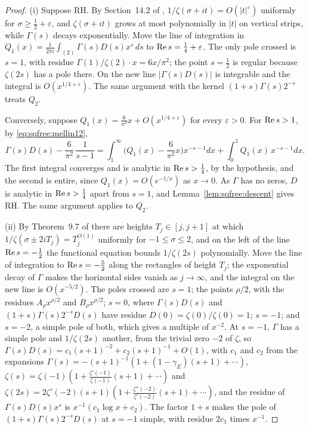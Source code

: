 \begin{proof}
(i) Suppose RH. By Section~14.2 of \cite{Titchmarsh}, $1/\zeta(\sigma+it)=O(|t|^\varepsilon)$ uniformly for $\sigma\ge\frac12+\varepsilon$, and $\zeta(\sigma+it)$ grows at most polynomially in $|t|$ on vertical strips, while $\Gamma(s)$ decays exponentially. Move the line of integration in $Q_1(x)=\frac1{2\pi i}\int_{(2)}\Gamma(s)D(s)x^s\,ds$ to $\operatorname{Re} s=\frac14+\varepsilon$. The only pole crossed is $s=1$, with residue $\Gamma(1)/\zeta(2)\cdot x=6x/\pi^2$; the point $s=\frac12$ is regular because $\zeta(2s)$ has a pole there. On the new line $|\Gamma(s)D(s)|$ is integrable and the integral is $O(x^{1/4+\varepsilon})$. The same argument with the kernel $(1+s)\Gamma(s)2^{-s}$ treats $Q_2$.

Conversely, suppose $Q_1(x)=\frac6{\pi^2}x+O(x^{1/4+\varepsilon})$ for every $\varepsilon>0$. For $\operatorname{Re} s>1$, by \eqref{eq:sqfree:mellin12},
\[
\Gamma(s)D(s)-\frac6{\pi^2}\,\frac1{s-1}=\int_1^\infty\Big(Q_1(x)-\frac6{\pi^2}x\Big)x^{-s-1}dx+\int_0^1Q_1(x)\,x^{-s-1}dx .
\]
The first integral converges and is analytic in $\operatorname{Re} s>\frac14$, by the hypothesis, and the second is entire, since $Q_1(x)=O(e^{-1/x})$ as $x\to0$. As $\Gamma$ has no zeros, $D$ is analytic in $\operatorname{Re} s>\frac14$ apart from $s=1$, and Lemma~\ref{lem:sqfree:descent} gives RH. The same argument applies to $Q_2$.

(ii) By Theorem~9.7 of \cite{Titchmarsh} there are heights $T_j\in[j,j+1]$ at which $1/\zeta(\sigma\pm2iT_j)=T_j^{O(1)}$ uniformly for $-1\le\sigma\le2$, and on the left of the line $\operatorname{Re} s=-\frac12$ the functional equation bounds $1/\zeta(2s)$ polynomially. Move the line of integration to $\operatorname{Re} s=-\frac52$ along the rectangles of height $T_j$; the exponential decay of $\Gamma$ makes the horizontal sides vanish as $j\to\infty$, and the integral on the new line is $O(x^{-5/2})$. The poles crossed are $s=1$; the points $\rho/2$, with the residues $A_\rho x^{\rho/2}$ and $B_\rho x^{\rho/2}$; $s=0$, where $\Gamma(s)D(s)$ and $(1+s)\Gamma(s)2^{-s}D(s)$ have residue $D(0)=\zeta(0)/\zeta(0)=1$; $s=-1$; and $s=-2$, a simple pole of both, which gives a multiple of $x^{-2}$. At $s=-1$, $\Gamma$ has a simple pole and $1/\zeta(2s)$ another, from the trivial zero $-2$ of $\zeta$, so $\Gamma(s)D(s)=c_1(s+1)^{-2}+c_2(s+1)^{-1}+O(1)$, with $c_1$ and $c_2$ from the expansions $\Gamma(s)=-(s+1)^{-1}(1+(1-\gamma_E)(s+1)+\cdots)$, $\zeta(s)=\zeta(-1)(1+\frac{\zeta'(-1)}{\zeta(-1)}(s+1)+\cdots)$ and $\zeta(2s)=2\zeta'(-2)(s+1)(1+\frac{\zeta''(-2)}{\zeta'(-2)}(s+1)+\cdots)$, and the residue of $\Gamma(s)D(s)x^s$ is $x^{-1}(c_1\log x+c_2)$. The factor $1+s$ makes the pole of $(1+s)\Gamma(s)2^{-s}D(s)$ at $s=-1$ simple, with residue $2c_1$ times $x^{-1}$.
\end{proof}

